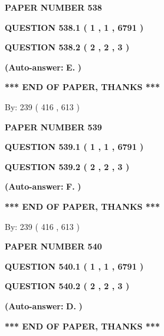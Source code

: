 \documentclass[12pt]{article}
\begin{document}
   
 {\textbf{ \Large{ PAPER NUMBER  538  }}}
   
   
   
   
  
  
{\textbf{\large{QUESTION
538.1 
 ( 1 , 1 , 6791 )
}}}
  
  
{\textbf{\large{QUESTION
538.2 
 ( 2 , 2 , 3 )
}}}
 
 
{\textbf{(Auto-answer:}}
{\textbf{\large{
E.}}}
{\textbf{)}}
 
 
   
   
   
   
\vspace{1.0in} 
{\textbf{\large{ *** END OF PAPER, THANKS *** }}} 
   
   
\hspace{1.0in} By: 
 239 ( 416 ,  613 )
   
   
   
   
\newpage 
\setcounter{page}{ 
   539001 } 
   
   
 {\textbf{ \Large{ PAPER NUMBER  539  }}}
   
   
   
   
  
  
{\textbf{\large{QUESTION
539.1 
 ( 1 , 1 , 6791 )
}}}
  
  
{\textbf{\large{QUESTION
539.2 
 ( 2 , 2 , 3 )
}}}
 
 
{\textbf{(Auto-answer:}}
{\textbf{\large{
F.}}}
{\textbf{)}}
 
 
   
   
   
   
\vspace{1.0in} 
{\textbf{\large{ *** END OF PAPER, THANKS *** }}} 
   
   
\hspace{1.0in} By: 
 239 ( 416 ,  613 )
   
   
   
   
\newpage 
\setcounter{page}{ 
   540001 } 
   
   
 {\textbf{ \Large{ PAPER NUMBER  540  }}}
   
   
   
   
  
  
{\textbf{\large{QUESTION
540.1 
 ( 1 , 1 , 6791 )
}}}
  
  
{\textbf{\large{QUESTION
540.2 
 ( 2 , 2 , 3 )
}}}
 
 
{\textbf{(Auto-answer:}}
{\textbf{\large{
D.}}}
{\textbf{)}}
 
 
   
   
   
   
\vspace{1.0in} 
{\textbf{\large{ *** END OF PAPER, THANKS *** }}} 
   
\end{document}
